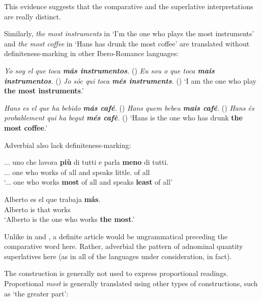 \documentclass[output=paper
,modfonts
,nonflat]{langsci/langscibook}
\begin{document}
This evidence suggests that the comparative and the superlative interpretations are really distinct.

Similarly, \textit{the most instruments} in `I'm the one who plays the most instruments' and \textit{the most coffee} in `Hans has drunk the most coffee' are translated without definiteness-marking in other Ibero-Romance languages:

\ea \label{ex:coppockstrand:70}
\settowidth{}
\ea \textit{Yo soy el que toca \textbf{más instrumentos}.} \jam()
\ex \textit{Eu sou o que toca \textbf{mais instrumentos}.} \jam()
\ex \textit{Jo sóc qui toca \textbf{més instruments}.} \jam ()
`I am the one who play \textbf{the most instruments}.'
\z 
\z

\ea \label{ex:coppockstrand:71}
\settowidth{}
\ea \textit{Hans es el que ha bebido \textbf{más café}.} \jam()
\ex \textit{Hans quem bebeu \textbf{mais café}.} \jam()
\ex \textit{Hans és probablement qui ha begut \textbf{més cafè}.} \hfill ()
\sn`Hans is the one who has drunk \textbf{the most coffee}.'
\z
\z 

Adverbial  also lack definiteness-marking:

\ea \label{ex:coppockstrand:72}
\gll ... uno che lavora \textbf{più} di tutti e parla \textbf{meno} di tutti. \\
... one who works \cmpr{} of all and speaks little.\cmpr{} of all\\ 
\glt `... one who works \textbf{most} of all and speaks \textbf{least} of all'
\z

\ea \label{ex:coppockstrand:73}
\gll Alberto es el que trabaja \textbf{m\'as}.\\
Alberto is  that works \cmpr\\ 
\glt `Alberto is the one who works \textbf{the most}.' 
\z

Unlike in  and , a definite article would be ungrammatical preceding the comparative word here. Rather, adverbial  the pattern of adnominal quantity superlatives here (as in all of the languages under consideration, in fact).

The  construction is generally not used to express proportional readings. Proportional \textit{most} is generally translated using other types of constructions, such as `the greater part':
\end{document}
